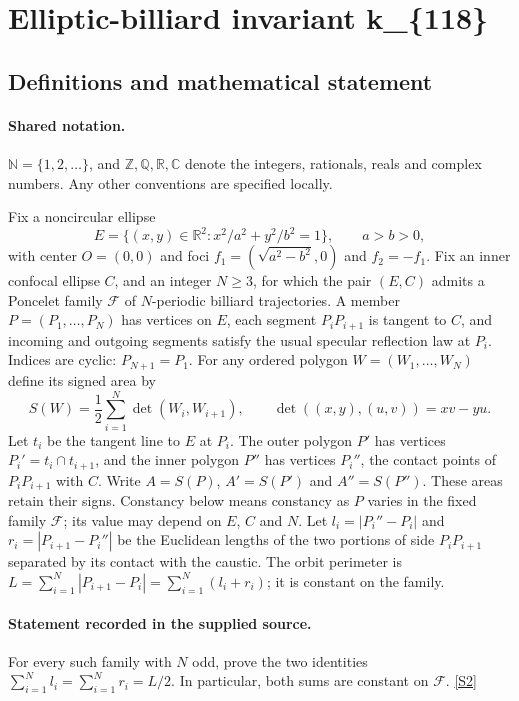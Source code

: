 \documentclass[11pt]{article}
\newcommand{\sref}[2]{\hyperlink{source:#1:#2}{[S#2]}}
\begin{document}
\section{Elliptic-billiard invariant k\_\{118\}}\label{statement}

\subsection{Definitions and mathematical statement}

\paragraph{Shared notation.}$\mathbb N=\{1,2,\ldots\}$, and $\mathbb Z,\mathbb Q,\mathbb R,\mathbb C$ denote the integers, rationals, reals and complex numbers. Any other conventions are specified locally.


Fix a noncircular ellipse
\[
E=\{(x,y)\in\mathbb R^2:x^2/a^2+y^2/b^2=1\},\qquad a>b>0,
\]
with center $O=(0,0)$ and foci $f_1=(\sqrt{a^2-b^2},0)$ and $f_2=-f_1$. Fix an inner confocal ellipse $C$, and an integer $N\geq3$, for which the pair $(E,C)$ admits a Poncelet family $\mathcal F$ of $N$-periodic billiard trajectories. A member $P=(P_1,\ldots,P_N)$ has vertices on $E$, each segment $P_iP_{i+1}$ is tangent to $C$, and incoming and outgoing segments satisfy the usual specular reflection law at $P_i$. Indices are cyclic: $P_{N+1}=P_1$.
For any ordered polygon $W=(W_1,\ldots,W_N)$ define its signed area by
\[
S(W)=\frac12\sum_{i=1}^N\det(W_i,W_{i+1}),\qquad
\det((x,y),(u,v))=xv-yu.
\]
Let $t_i$ be the tangent line to $E$ at $P_i$. The outer polygon $P'$ has vertices $P_i'=t_i\cap t_{i+1}$, and the inner polygon $P''$ has vertices $P_i''$, the contact points of $P_iP_{i+1}$ with $C$. Write $A=S(P)$, $A'=S(P')$ and $A''=S(P'')$. These areas retain their signs. Constancy below means constancy as $P$ varies in the fixed family $\mathcal F$; its value may depend on $E$, $C$ and $N$.
Let $l_i=|P_i''-P_i|$ and $r_i=|P_{i+1}-P_i''|$ be the Euclidean lengths of the two portions of side $P_iP_{i+1}$ separated by its contact with the caustic. The orbit perimeter is $L=\sum_{i=1}^N|P_{i+1}-P_i|=\sum_{i=1}^N(l_i+r_i)$; it is constant on the family.
\paragraph{Statement recorded in the supplied source.}
For every such family with $N$ odd, prove the two identities $\displaystyle\sum_{i=1}^N l_i=\sum_{i=1}^N r_i=L/2$. In particular, both sums are constant on $\mathcal F$. \sref{statement}{2}
\end{document}
